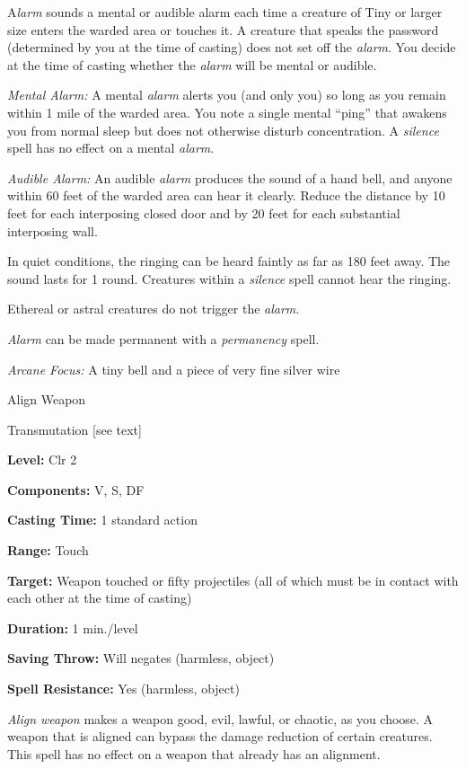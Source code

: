 \documentclass{article}
\begin{document}
A\textit{larm }sounds a mental or audible alarm each time a creature of Tiny or 
larger size enters the warded area or touches it. A creature that speaks the password 
(determined by you at the time of casting) does not set off the \textit{alarm}. 
You decide at the time of casting whether the \textit{alarm }will be mental or 
audible.

\textit{Mental Alarm: }A mental \textit{alarm }alerts you (and only you) so long 
as you remain within 1 mile of the warded area. You note a single mental ``ping'' 
that awakens you from normal sleep but does not otherwise disturb concentration. 
A \textit{silence }spell has no effect on a mental \textit{alarm}.

\textit{Audible Alarm: }An audible \textit{alarm }produces the sound of a hand 
bell, and anyone within 60 feet of the warded area can hear it clearly. Reduce 
the distance by 10 feet for each interposing closed door and by 20 feet for each 
substantial interposing wall.

In quiet conditions, the ringing can be heard faintly as far as 180 feet away. 
The sound lasts for 1 round. Creatures within a \textit{silence }spell cannot hear 
the ringing.

Ethereal or astral creatures do not trigger the \textit{alarm}.

\textit{Alarm }can be made permanent with a \textit{permanency }spell.

\textit{Arcane Focus:} A tiny bell and a piece of very fine silver wire

\vspace{12pt}
Align Weapon

Transmutation [see text]

\textbf{Level:} Clr 2

\textbf{Components:} V, S, DF

\textbf{Casting Time:} 1 standard action

\textbf{Range:} Touch

\textbf{Target: }Weapon touched or fifty projectiles (all of which must be in contact 
with each other at the time of casting)

\textbf{Duration:} 1 min./level

\textbf{Saving Throw: }Will negates (harmless, object)

\textbf{Spell Resistance:} Yes (harmless, object)

\textit{Align weapon }makes a weapon good, evil, lawful, or chaotic, as you choose. 
A weapon that is aligned can bypass the damage reduction of certain creatures. 
This spell has no effect on a weapon that already has an alignment.
\end{document}
